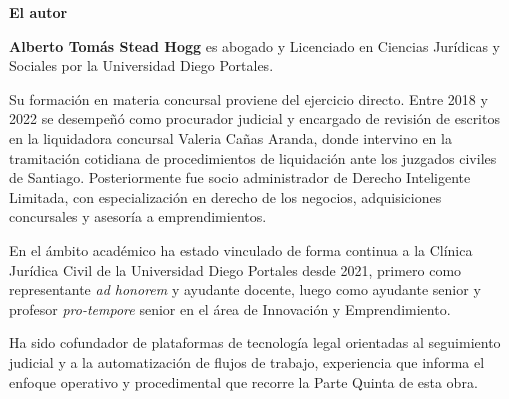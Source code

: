 \thispagestyle{empty}
\null\vspace{2cm}
\begin{center}
{\sffamily\large\bfseries\color{ColorTinta} El autor}
\end{center}
\vspace{0.6cm}
\noindent
\textbf{Alberto Tomás Stead Hogg} es abogado y Licenciado en Ciencias Jurídicas y
Sociales por la Universidad Diego Portales.\par
\vspace{8pt}
\noindent
Su formación en materia concursal proviene del ejercicio directo. Entre 2018 y 2022 se
desempeñó como procurador judicial y encargado de revisión de escritos en la liquidadora
concursal Valeria Cañas Aranda, donde intervino en la tramitación cotidiana de
procedimientos de liquidación ante los juzgados civiles de Santiago. Posteriormente fue
socio administrador de Derecho Inteligente Limitada, con especialización en derecho de
los negocios, adquisiciones concursales y asesoría a emprendimientos.\par
\vspace{8pt}
\noindent
En el ámbito académico ha estado vinculado de forma continua a la Clínica Jurídica Civil
de la Universidad Diego Portales desde 2021, primero como representante \emph{ad
honorem} y ayudante docente, luego como ayudante senior y profesor \emph{pro-tempore}
senior en el área de Innovación y Emprendimiento.\par
\vspace{8pt}
\noindent
Ha sido cofundador de plataformas de tecnología legal orientadas al seguimiento judicial
y a la automatización de flujos de trabajo, experiencia que informa el enfoque
operativo y procedimental que recorre la Parte Quinta de esta obra.\par
\vfill
\cleardoublepage
